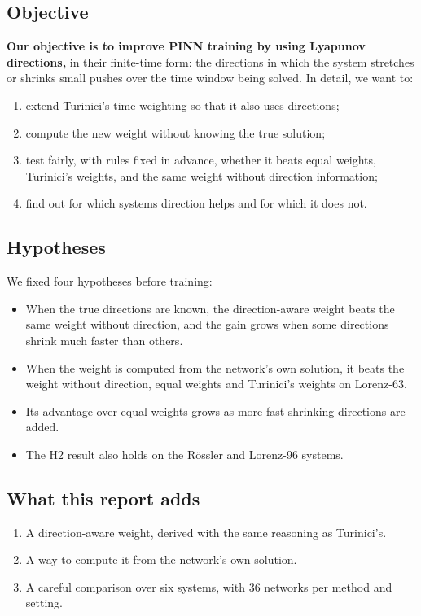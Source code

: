 \documentclass[11pt,a4paper]{article}
\begin{document}
\subsection{Objective}
\textbf{Our objective is to improve PINN training by using Lyapunov directions,} in their
finite-time form: the directions in which the system stretches or shrinks small pushes over
the time window being solved. In
detail, we want to:
\begin{enumerate}
\item extend Turinici's time weighting so that it also uses directions;
\item compute the new weight without knowing the true solution;
\item test fairly, with rules fixed in advance, whether it beats equal weights,
  Turinici's weights, and the same weight without direction information;
\item find out for which systems direction helps and for which it does not.
\end{enumerate}

\subsection{Hypotheses}
We fixed four hypotheses before training:
\begin{itemize}
\item[\textbf{H1}] When the true directions are known, the direction-aware weight beats
  the same weight without direction, and the gain grows when some directions shrink much
  faster than others.
\item[\textbf{H2}] When the weight is computed from the network's own solution, it beats
  the weight without direction, equal weights and Turinici's weights on Lorenz-63.
\item[\textbf{H3}] Its advantage over equal weights grows as more fast-shrinking
  directions are added.
\item[\textbf{H4}] The H2 result also holds on the Rössler and Lorenz-96 systems.
\end{itemize}

\subsection{What this report adds}
\begin{enumerate}
\item A direction-aware weight, derived with the same reasoning as Turinici's.
\item A way to compute it from the network's own solution.
\item A careful comparison over six systems, with 36 networks per method and setting.
\end{enumerate}
\end{document}
